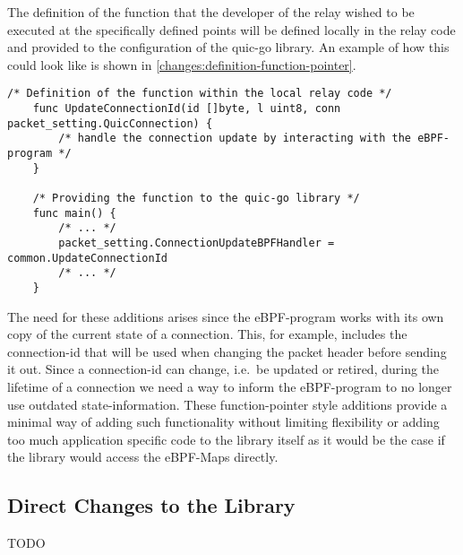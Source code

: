 The definition of the function that the developer of the relay wished to be executed at the specifically
defined points will be defined locally in the relay code and provided to the configuration of the quic-go library.
An example of how this could look like is shown in \autoref{changes:definition-function-pointer}.
\vspace{0.2cm}
\begin{lstlisting}[style=GoStyle, label=changes:definition-function-pointer, caption=An example of how the addition looks on the relay side.]
    /* Definition of the function within the local relay code */
    func UpdateConnectionId(id []byte, l uint8, conn packet_setting.QuicConnection) {
        /* handle the connection update by interacting with the eBPF-program */
    }   

    /* Providing the function to the quic-go library */
    func main() {
        /* ... */
        packet_setting.ConnectionUpdateBPFHandler = common.UpdateConnectionId
        /* ... */
    }
\end{lstlisting}

The need for these additions arises since the eBPF-program works with its own copy of the current state of a connection.
This, for example, includes the connection-id that will be used when changing the packet header before sending it out.
Since a connection-id can change, i.e.~be updated or retired, during the lifetime of a connection we need a way to inform 
the eBPF-program to no longer use outdated state-information.
These function-pointer style additions provide a minimal way of adding such functionality without limiting flexibility 
or adding too much application specific code to the library itself as it would be the case if the library would access 
the eBPF-Maps directly.

\subsection{Direct Changes to the Library}
TODO